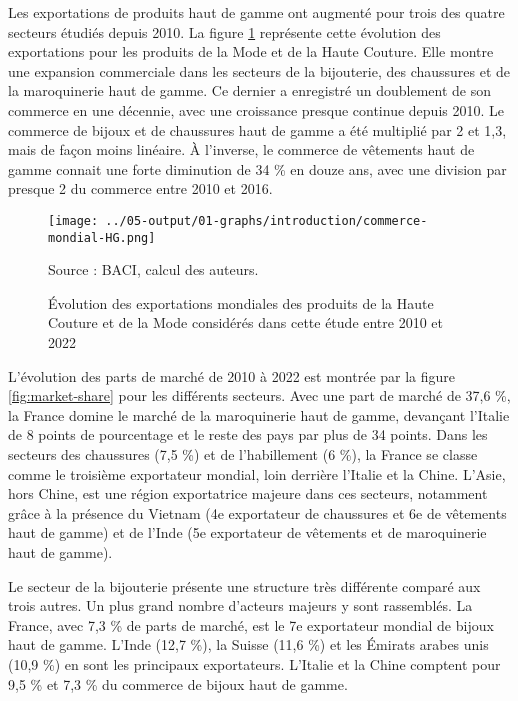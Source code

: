 \documentclass[french,10pt,a4paper]{article}
\begin{document}
Les exportations de produits haut de gamme ont augmenté pour trois des quatre secteurs étudiés depuis 2010. La figure \ref{fig:commerce-mondial-HG} représente cette évolution des exportations pour les produits de la Mode et de la Haute Couture. Elle montre une expansion commerciale dans les secteurs de la bijouterie, des chaussures et de la maroquinerie haut de gamme. Ce dernier a enregistré un doublement de son commerce en une décennie, avec une croissance presque continue depuis 2010. Le commerce de bijoux et de chaussures haut de gamme a été multiplié par 2 et 1,3, mais de façon moins linéaire. À l'inverse, le commerce de vêtements haut de gamme connait une forte diminution de 34 \% en douze ans, avec une division par presque 2 du commerce entre 2010 et 2016.

\begin{figure}[!h]
  \centering
  \texttt{[image: ../05-output/01-graphs/introduction/commerce-mondial-HG.png]}
  \captionsetup{justification=raggedright,singlelinecheck=false, font=small}
  \caption*{Source : BACI, calcul des auteurs.}
  \captionsetup{justification=centering, singlelinecheck=true, font=normalsize}
  \caption{Évolution des exportations mondiales des produits de la Haute Couture et de la Mode considérés dans cette étude entre 2010 et 2022}
  \label{fig:commerce-mondial-HG}
\end{figure}

\bigskip

L'évolution des parts de marché de 2010 à 2022 est montrée par la figure \ref{fig:market-share} pour les différents secteurs. Avec une part de marché de 37,6 \%, la France domine le marché de la maroquinerie haut de gamme, devançant l'Italie de 8 points de pourcentage et le reste des pays par plus de 34 points. Dans les secteurs des chaussures (7,5 \%) et de l'habillement (6 \%), la France se classe comme le troisième exportateur mondial, loin derrière l'Italie et la Chine. L'Asie, hors Chine, est une région exportatrice majeure dans ces secteurs, notamment grâce à la présence du Vietnam (4e exportateur de chaussures et 6e de vêtements haut de gamme) et de l'Inde (5e exportateur de vêtements et de maroquinerie haut de gamme). 

Le secteur de la bijouterie présente une structure très différente comparé aux trois autres. Un plus grand nombre d'acteurs majeurs y sont rassemblés. La France, avec 7,3 \% de parts de marché, est le 7e exportateur mondial de bijoux haut de gamme. L'Inde (12,7 \%), la Suisse (11,6 \%) et les Émirats arabes unis (10,9 \%) en sont les principaux exportateurs. L'Italie et la Chine comptent pour 9,5 \% et 7,3 \% du commerce de bijoux haut de gamme.
\end{document}
